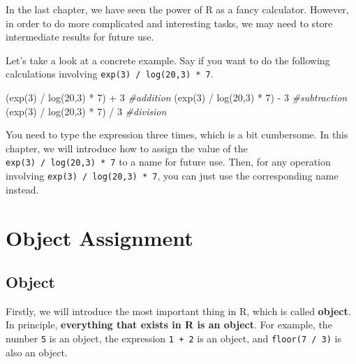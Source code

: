 \documentclass[
]{book}
\newenvironment{Shaded}{\begin{snugshade}}{\end{snugshade}}
\newcommand{\CommentTok}[1]{\textcolor[rgb]{0.56,0.35,0.01}{\textit{#1}}}
\newcommand{\DecValTok}[1]{\textcolor[rgb]{0.00,0.00,0.81}{#1}}
\newcommand{\FunctionTok}[1]{\textcolor[rgb]{0.00,0.00,0.00}{#1}}
\newcommand{\NormalTok}[1]{#1}
\newcommand{\SpecialCharTok}[1]{\textcolor[rgb]{0.00,0.00,0.00}{#1}}
\begin{document}
In the last chapter, we have seen the power of R as a fancy calculator. However, in order to do more complicated and interesting tasks, we may need to store intermediate results for future use.

Let's take a look at a concrete example. Say if you want to do the following calculations involving \texttt{exp(3)\ /\ log(20,3)\ *\ 7}.

\begin{Shaded}
\begin{Highlighting}[]
\NormalTok{(}\FunctionTok{exp}\NormalTok{(}\DecValTok{3}\NormalTok{) }\SpecialCharTok{/} \FunctionTok{log}\NormalTok{(}\DecValTok{20}\NormalTok{,}\DecValTok{3}\NormalTok{) }\SpecialCharTok{*} \DecValTok{7}\NormalTok{) }\SpecialCharTok{+} \DecValTok{3} \CommentTok{\#addition}
\NormalTok{(}\FunctionTok{exp}\NormalTok{(}\DecValTok{3}\NormalTok{) }\SpecialCharTok{/} \FunctionTok{log}\NormalTok{(}\DecValTok{20}\NormalTok{,}\DecValTok{3}\NormalTok{) }\SpecialCharTok{*} \DecValTok{7}\NormalTok{) }\SpecialCharTok{{-}} \DecValTok{3} \CommentTok{\#subtraction}
\NormalTok{(}\FunctionTok{exp}\NormalTok{(}\DecValTok{3}\NormalTok{) }\SpecialCharTok{/} \FunctionTok{log}\NormalTok{(}\DecValTok{20}\NormalTok{,}\DecValTok{3}\NormalTok{) }\SpecialCharTok{*} \DecValTok{7}\NormalTok{) }\SpecialCharTok{/} \DecValTok{3} \CommentTok{\#division}
\end{Highlighting}
\end{Shaded}

You need to type the expression three times, which is a bit cumbersome. In this chapter, we will introduce how to assign the value of the \texttt{exp(3)\ /\ log(20,3)\ *\ 7} to a name for future use. Then, for any operation involving \texttt{exp(3)\ /\ log(20,3)\ *\ 7}, you can just use the corresponding name instead.

\hypertarget{Object-Assignment}{%
\section{Object Assignment}\label{Object-Assignment}}

\hypertarget{object}{%
\subsection{Object}\label{object}}

Firstly, we will introduce the most important thing in R, which is called \textbf{object}. In principle, \textbf{everything that exists in R is an object}. For example, the number \texttt{5} is an object, the expression \texttt{1\ +\ 2} is an object, and \texttt{floor(7\ /\ 3)} is also an object.
\end{document}
